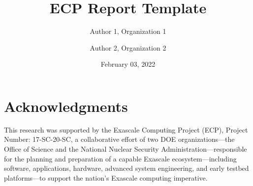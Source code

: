 \documentclass{ecpreport-publicv1}
\author{Author 1, Organization 1
  \and Author 2, Organization 2
  }
\title{ECP Report Template}
\date{February 03, 2022}
\begin{document}
\frontmatter



%






\mainmatter



\clearpage

\newpage
\section*{Acknowledgments}

This research was supported by the Exascale Computing Project (ECP), Project
Number: 17-SC-20-SC, a collaborative effort of two DOE organizations---the
Office of Science and the National Nuclear Security
Administration---responsible for the planning and preparation of a capable
Exascale ecosystem---including software, applications, hardware, advanced
system engineering, and early testbed platforms---to support the nation's
Exascale computing imperative.

\newpage


\end{document}
